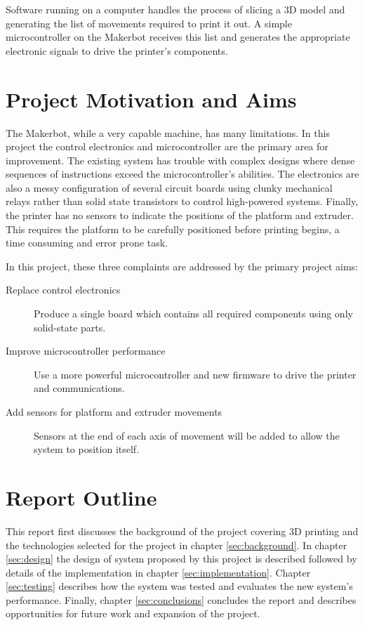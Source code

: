 		Software running on a computer handles the process of slicing a 3D model and
		generating the list of movements required to print it out.  A simple
		microcontroller on the Makerbot receives this list and generates the
		appropriate electronic signals to drive the printer's components.
		
	\section{Project Motivation and Aims}
		
		The Makerbot, while a very capable machine, has many limitations. In this
		project the control electronics and microcontroller are the primary area for
		improvement. The existing system has trouble with complex designs where
		dense sequences of instructions exceed the microcontroller's abilities. The
		electronics are also a messy configuration of several circuit boards using
		clunky mechanical relays rather than solid state transistors to control
		high-powered systems. Finally, the printer has no sensors to indicate the
		positions of the platform and extruder. This requires the platform to be
		carefully positioned before printing begins, a time consuming and error
		prone task.
		
		In this project, these three complaints are addressed by the primary project
		aims:
		\begin{description}
			
			\item[Replace control electronics] Produce a single board which contains
			all required components using only solid-state parts.
			
			\item[Improve microcontroller performance] Use a more powerful
			microcontroller and new firmware to drive the printer and communications.
			
			\item[Add sensors for platform and extruder movements] Sensors at the end
			of each axis of movement will be added to allow the system to position
			itself.
			
		\end{description}
	
	\section{Report Outline}
		
		This report first discusses the background of the project covering 3D
		printing and the technologies selected for the project in chapter
		\ref{sec:background}. In chapter \ref{sec:design} the design of system
		proposed by this project is described followed by details of the
		implementation in chapter \ref{sec:implementation}. Chapter
		\ref{sec:testing} describes how the system was tested and evaluates the new
		system's performance. Finally, chapter \ref{sec:conclusions} concludes the
		report and describes opportunities for future work and expansion of the
		project.

